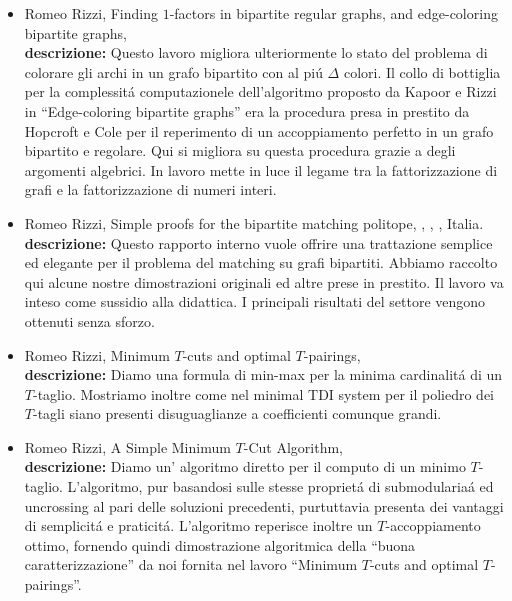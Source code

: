 \documentclass[10pt]{article}
\begin{document}
\begin{itemize}
  \vspace{1.4mm}
  \item[] {\sc Romeo Rizzi},
   \newblock  Finding $1$-factors in bipartite regular graphs,
              and edge-coloring bipartite graphs,
    \\
{\bf descrizione:}
Questo lavoro migliora ulteriormente
lo stato del problema di colorare gli archi in un grafo
bipartito con al pi\'u $\Delta$ colori.
Il collo di bottiglia per la complessit\'a
computazionele dell'algoritmo proposto
da Kapoor
e Rizzi in ``Edge-coloring bipartite graphs''
era la procedura presa in prestito da Hopcroft e Cole
per il reperimento di un accoppiamento perfetto
in un grafo bipartito e regolare.
Qui si migliora su questa procedura
grazie a degli argomenti algebrici.
In lavoro mette in luce il legame tra
la fattorizzazione di grafi e la fattorizzazione
di numeri interi.\\

  \vspace{1.4mm}
  \item[] {\sc Romeo Rizzi},
   \newblock  Simple proofs for the bipartite matching politope,
   ,
   ,
   , Italia.\\
{\bf descrizione:}
Questo rapporto interno vuole offrire
una trattazione semplice ed elegante
per il problema del matching su grafi bipartiti.
Abbiamo raccolto qui
alcune nostre dimostrazioni originali
ed altre prese in prestito.
Il lavoro va inteso come sussidio alla didattica.
I principali risultati del settore
vengono ottenuti senza sforzo.\\

  \vspace{1.4mm}
  \item[] {\sc Romeo Rizzi},
   \newblock  Minimum $T$-cuts and optimal $T$-pairings,
   \\
{\bf descrizione:}
Diamo una formula di min-max
per la minima cardinalit\'a di un $T$-taglio.
Mostriamo inoltre come nel minimal TDI system
per il poliedro dei $T$-tagli
siano presenti disuguaglianze a coefficienti comunque grandi.\\

  \vspace{1.4mm}
  \item[] {\sc Romeo Rizzi},
   \newblock  A Simple Minimum $T$-Cut Algorithm,
   \\
{\bf descrizione:}
Diamo un' algoritmo diretto per il computo
di un minimo $T$-taglio.
L'algoritmo, pur basandosi sulle stesse propriet\'a
di submodularia\'a ed uncrossing al pari
delle soluzioni precedenti,
purtuttavia presenta dei vantaggi
di semplicit\'a e praticit\'a.
L'algoritmo reperisce inoltre
un $T$-accoppiamento ottimo,
fornendo quindi dimostrazione algoritmica
della ``buona caratterizzazione''
da noi fornita nel lavoro
``Minimum $T$-cuts and optimal $T$-pairings''.\\
\end{itemize}
\end{document}
